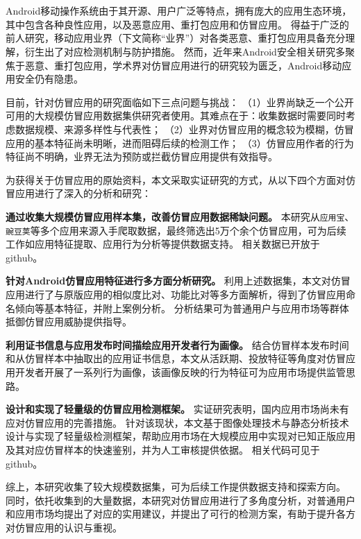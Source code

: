 \cleardoublepage{}

\chapter*{}
\vspace{-5mm}

\setlength{\baselineskip}{25pt} %

Android移动操作系统由于其开源、用户广泛等特点，拥有庞大的应用生态环境，其中包含各种良性应用，以及恶意应用、重打包应用和仿冒应用。
得益于广泛的前人研究，移动应用业界（下文简称``业界''）对各类恶意、重打包应用具备充分理解，衍生出了对应检测机制与防护措施。
然而，近年来Android安全相关研究多聚焦于恶意、重打包应用，学术界对仿冒应用进行的研究较为匮乏，Android移动应用安全仍有隐患。

目前，针对仿冒应用的研究面临如下三点问题与挑战：
（1）业界尚缺乏一个公开可用的大规模仿冒应用数据集供研究者使用。其难点在于：收集数据时需要同时考虑数据规模、来源多样性与代表性；
（2）业界对仿冒应用的概念较为模糊，仿冒应用的基本特征尚未明晰，进而阻碍后续的检测工作；
（3）仿冒应用作者的行为特征尚不明确，业界无法为预防或拦截仿冒应用提供有效指导。

为获得关于仿冒应用的原始资料，本文采取实证研究的方式，从以下四个方面对仿冒应用进行了深入的分析和研究：

\textbf{通过收集大规模仿冒应用样本集，改善仿冒应用数据稀缺问题。}
本研究从\texttt{应用宝}、\texttt{豌豆荚}等多个应用来源入手爬取数据，最终筛选出5万个余个仿冒应用，可为后续工作如应用特征提取、应用行为分析等提供数据支持。
相关数据已开放于github。

\textbf{针对Android仿冒应用特征进行多方面分析研究。}
利用上述数据集，本文对仿冒应用进行了与原版应用的相似度比对、功能比对等多方面解析，得到了仿冒应用命名倾向等基本特征，并附上案例分析。
分析结果可为普通用户与应用市场等群体抵御仿冒应用威胁提供指导。

\textbf{利用证书信息与应用发布时间描绘应用开发者行为画像。}
结合仿冒样本发布时间和从仿冒样本中抽取出的应用证书信息，本文从活跃期、投放特征等角度对仿冒应用开发者开展了一系列行为画像，该画像反映的行为特征可为应用市场提供监管思路。

\textbf{设计和实现了轻量级的仿冒应用检测框架。}
实证研究表明，国内应用市场尚未有应对仿冒应用的完善措施。
针对该现状，本文基于图像处理技术与静态分析技术设计与实现了轻量级检测框架\mytool ，帮助应用市场在大规模应用中实现对已知正版应用及其对应仿冒样本的快速鉴别，并为人工审核提供依据。
相关代码可见于github。

综上，本研究收集了较大规模数据集，可为后续工作提供数据支持和探索方向。
同时，依托收集到的大量数据，本研究对仿冒应用进行了多角度分析，对普通用户和应用市场均提出了对应的实用建议，并提出了可行的检测方案，有助于提升各方对仿冒应用的认识与重视。

 

